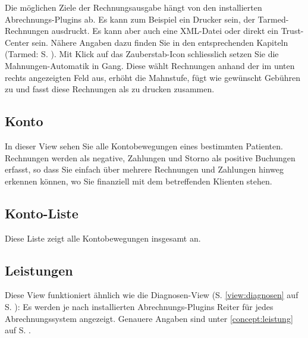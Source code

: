 Die möglichen Ziele der Rechnungsausgabe hängt von den installierten Abrechnungs-Plugins ab. Es kann zum Beispiel ein Drucker sein, der Tarmed-Rechnungen ausdruckt. Es kann aber auch eine XML-Datei oder direkt ein Trust-Center sein. Nähere Angaben dazu finden Sie in den entsprechenden Kapiteln (Tarmed: S. \pageref{arzttarife}).
\bigskip
Mit Klick auf das Zauberstab-Icon schliesslich setzen Sie die Mahnungen-Automatik in Gang. Diese wählt Rechnungen anhand der im unten rechts angezeigten Feld aus, erhöht die Mahnstufe, fügt wie gewünscht Gebühren zu und fasst diese Rechnungen als \glqq zu drucken\grqq{} zusammen.

\subsection{Konto}
In dieser View sehen Sie alle Kontobewegungen eines bestimmten Patienten.
Rechnungen werden als negative, Zahlungen und Storno als positive
Buchungen erfasst, so dass Sie einfach über mehrere Rechnungen und Zahlungen
hinweg erkennen können, wo Sie finanziell mit dem betreffenden Klienten stehen.

\subsection{Konto-Liste}
Diese Liste zeigt alle Kontobewegungen insgesamt an.

\subsection{Leistungen}
Diese View funktioniert ähnlich wie die Diagnosen-View (S. \ref{view:diagnosen} auf S. \pageref{view:diagnosen}): Es werden je nach installierten Abrechnungs-Plugins Reiter für jedes Abrechnungssystem angezeigt. Genauere Angaben sind unter \ref{concept:leistung} auf S. \pageref{concept:leistung}.



